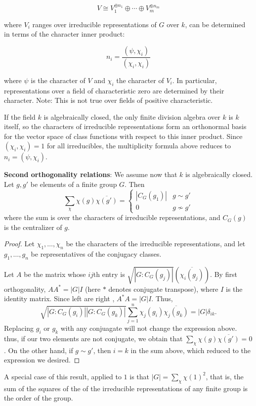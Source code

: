 \documentclass[12pt]{article}
\begin{document}
$$V\cong V_1^{\oplus n_1}\oplus\cdots\oplus V_m^{\oplus n_m}$$ 

where $V_i$ ranges over irreducible representations of $G$ over $k$, can be 
determined in terms of the character inner product: 

$$n_i=\frac{(\psi,\chi_i)}{(\chi_i,\chi_i)}$$

where $\psi$ is the character of $V$ and $\chi_i$ the character of $V_i$.
In particular, representations over a field of characteristic zero are determined by their character.  Note: This is not true over fields of positive 
characteristic.

If the field $k$ is algebraically closed, 
the only finite division algebra over $k$ is $k$ itself, so 
the characters of irreducible representations form an orthonormal basis for 
the vector space of class functions with respect to this inner product.
Since $(\chi_i,\chi_i)=1$ for all irreducibles, the multiplicity formula
above reduces to $n_i=(\psi,\chi_i)$.


\textbf{Second orthogonality relations}:
We assume now that $k$ is algebraically closed.
Let $g,g'$ be elements of a finite group $G$.
Then $$\sum_{\chi}\chi(g)\overline{\chi(g')}=\begin{cases}|C_G(g_1)|&g\sim g'\\ 0&g\nsim g'\end{cases}$$
where the sum is over the characters of irreducible representations, and $C_G(g)$ is the centralizer of $g$.

\begin{proof}
Let $\chi_1,\ldots,\chi_n$ be the characters of the irreducible representations,
and let $g_1,\ldots,g_n$ be representatives of the conjugacy classes.

Let $A$ be the matrix whose $ij$th entry is $\sqrt{|G:C_G(g_j)|}(\overline{\chi_i(g_j)})$.
By first orthogonality, $AA^{*}=|G|I$ (here $*$ denotes conjugate transpose),
where $I$ is the identity matrix.  Since left  are right ,
$A^{*}A=|G|I$.  Thus, 
$$\sqrt{|G:C_G(g_i)||G:C_G(g_k)|}\sum_{j=1}^n\chi_j(g_i)\overline{\chi_j(g_k)}=|G|\delta_{ik}.$$
Replacing $g_i$ or $g_k$ with any conjuagate will not change the expression above.
thus, if our two elements are not conjugate, we obtain that $\sum_\chi\chi(g)\overline{\chi(g')}=0$.
On the other hand, if $g\sim g'$, then $i=k$ in the sum above, which reduced to the expression
we desired.
\end{proof}

A special case of this result, applied to $1$ is that $|G|=\sum_{\chi}\chi(1)^2$, that is, the sum of the squares of the  of the irreducible representations of any finite group is the order of the group.
\end{document}
